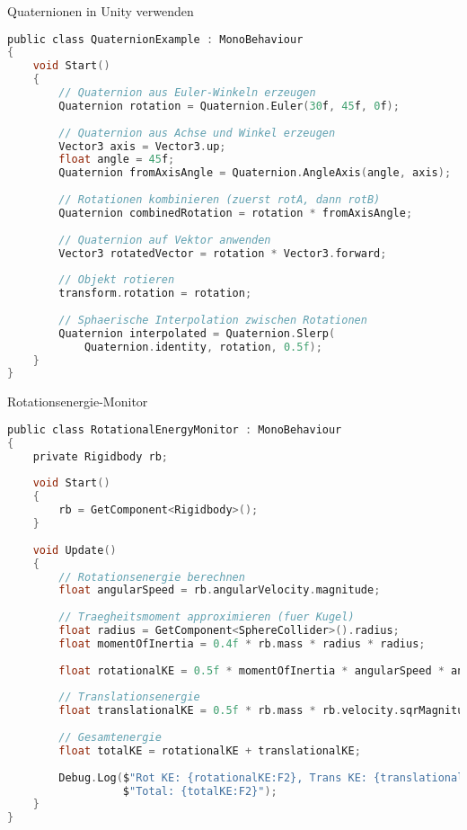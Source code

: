 \begin{code}{Quaternionen in Unity verwenden}
\begin{lstlisting}[language=C, style=basesmol]
public class QuaternionExample : MonoBehaviour 
{
    void Start() 
    {
        // Quaternion aus Euler-Winkeln erzeugen
        Quaternion rotation = Quaternion.Euler(30f, 45f, 0f);
        
        // Quaternion aus Achse und Winkel erzeugen
        Vector3 axis = Vector3.up;
        float angle = 45f;
        Quaternion fromAxisAngle = Quaternion.AngleAxis(angle, axis);
        
        // Rotationen kombinieren (zuerst rotA, dann rotB)
        Quaternion combinedRotation = rotation * fromAxisAngle;
        
        // Quaternion auf Vektor anwenden
        Vector3 rotatedVector = rotation * Vector3.forward;
        
        // Objekt rotieren
        transform.rotation = rotation;
        
        // Sphaerische Interpolation zwischen Rotationen
        Quaternion interpolated = Quaternion.Slerp(
            Quaternion.identity, rotation, 0.5f);
    }
}
\end{lstlisting}
\end{code}

\begin{code}{Rotationsenergie-Monitor}
\begin{lstlisting}[language=C, style=basesmol]
public class RotationalEnergyMonitor : MonoBehaviour 
{
    private Rigidbody rb;
    
    void Start() 
    {
        rb = GetComponent<Rigidbody>();
    }
    
    void Update() 
    {
        // Rotationsenergie berechnen
        float angularSpeed = rb.angularVelocity.magnitude;
        
        // Traegheitsmoment approximieren (fuer Kugel)
        float radius = GetComponent<SphereCollider>().radius;
        float momentOfInertia = 0.4f * rb.mass * radius * radius;
        
        float rotationalKE = 0.5f * momentOfInertia * angularSpeed * angularSpeed;
        
        // Translationsenergie
        float translationalKE = 0.5f * rb.mass * rb.velocity.sqrMagnitude;
        
        // Gesamtenergie
        float totalKE = rotationalKE + translationalKE;
        
        Debug.Log($"Rot KE: {rotationalKE:F2}, Trans KE: {translationalKE:F2}, " +
                  $"Total: {totalKE:F2}");
    }
}
\end{lstlisting}
\end{code}

